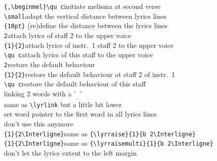 \documentclass[twoside]{article}
\begin{document}
\begin{tabbing}
\verb|{,\beginmel}\qu c|\>initiate melisma at second verse\\[.8ex]
\verb|\small|\>adapt the vertical distance between lyrics lines\\
\verb|{10pt}|\> (re)define the distance between the lyrics lines\\[.8ex]
\verb|2|\>attach lyrics of staff 2 to the upper voice\\
\verb|{1}{2}|\>attach lyrics of instr.\ 1 staff 2 to the upper voice\\
\verb|\qu c|\>attach lyrics of this staff to the upper voice\\
\verb|2|\>restore the default behaviour\\
\verb|{1}{2}|\>restore the default behaviour at staff 2 of instr.\ 1\\
\verb|\qu c|\>restore the default behaviour of this staff\\[.8ex]
\>linking 2 words with a '$_{_\smile}$'\\
\>same as \verb|\lyrlink| but a little bit lower\\[.8ex]
\>set word pointer to the first word in all lyrics lines\\[.8ex]
\>don't use this anymore\\
\verb|{1}{2\Interligne}|\>same as \verb|{\lyrraise}{1}{b 2\Interligne}|\\
\verb|{1}{2\Interligne}|\>same as \verb|{\lyrraisemulti}{1}{b 2\Interligne}|\\
\>don't let the lyrics extent to the left margin\\
\end{tabbing}
\end{document}
